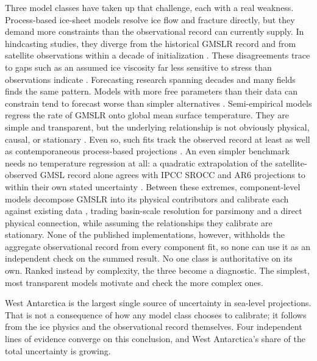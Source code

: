 \documentclass[12pt]{article}
\begin{document}
Three model classes have taken up that challenge, each with a real
weakness. Process-based ice-sheet models resolve ice flow and
fracture directly, but they demand more constraints than the
observational record can currently supply. In hindcasting studies, they
diverge from the historical GMSLR record \citep{Aschwanden2021} and from
satellite observations within a decade of initialization
\citep{Fricker2025}. These disagreements trace to gaps such as an
assumed ice viscosity far less sensitive to stress than observations
indicate \citep{Millstein2022,GetraerMorlighem2025}. Forecasting
research spanning decades and many fields finds the same pattern.
Models with more free parameters than their data can constrain tend to
forecast worse than simpler alternatives \citep{Green2015,Makridakis2020}.
Semi-empirical models regress the rate of GMSLR onto global mean surface
temperature. They are simple and transparent, but the underlying
relationship is not obviously physical, causal, or stationary
\citep{Rahmstorf2007,Vermeer2009,Church2013}. Even so, such fits track
the observed record at least as well as contemporaneous process-based
projections \citep{Rahmstorf2012}. An even simpler benchmark needs no
temperature regression at all: a quadratic extrapolation of the
satellite-observed GMSL record alone agrees with IPCC SROCC and AR6
projections to within their own stated uncertainty \citep{Nerem2022}.
Between these extremes,
component-level models decompose GMSLR into its physical contributors
and calibrate each against existing data
\citep{Kopp2014,Mengel2016,Wong2017}, trading basin-scale resolution for
parsimony and a direct physical connection, while assuming the
relationships they calibrate are stationary. None of the published
implementations, however, withholds the aggregate observational record
from every component fit, so none can use it as an independent check on
the summed result. No one class is authoritative on its own. Ranked
instead by complexity, the three become a diagnostic. The simplest,
most transparent models motivate and check the more complex ones.

West Antarctica is the largest single source of uncertainty in
sea-level projections. That is not a consequence of how any model class
chooses to calibrate; it follows from the ice physics and the
observational record themselves. Four independent lines of evidence
converge on this conclusion, and West Antarctica's share of the total
uncertainty is growing.
\end{document}
